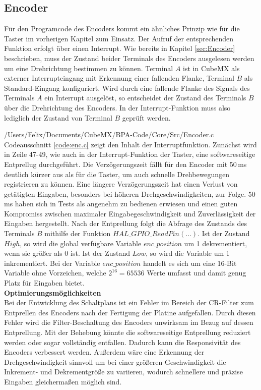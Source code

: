 
\subsection{Encoder}
Für den Programcode des Encoders kommt ein ähnliches Prinzip wie für die Taster im vorherigen Kapitel zum Einsatz. Der Aufruf der entsprechenden Funktion erfolgt über einen Interrupt.
Wie bereits in Kapitel \ref{sec:Encoder} beschrieben, muss der Zustand beider Terminals des Encoders ausgelesen werden um eine Drehrichtung bestimmen zu können. Terminal $A$ ist in CubeMX als externer Interrupteingang mit Erkennung einer fallenden Flanke, Terminal $B$ als Standard-Eingang konfiguriert. Wird durch eine fallende Flanke des Signals des Terminals $A$ ein Interrupt ausgelöst, so entscheidet der Zustand des Terminals $B$ über die Drehrichtung des Encoders. In der Interrupt-Funktion muss also lediglich der Zustand von Terminal $B$ geprüft werden. 

{/Users/Felix/Documents/CubeMX/BPA-Code/Core/Src/Encoder.c}
Codeausschnitt \ref{code:enc.c} zeigt den Inhalt der Interruptfunktion. Zunächst wird in Zeile 47-49, wie auch in der Interrupt-Funktion der Taster, eine softwareseitige Entprellug durchgeführt. Die Verzögerungszeit fällt für den Encoder mit 50\,ms deutlich kürzer aus als für die Taster, um auch schnelle Drehbewegungen registrieren zu können. Eine längere Verzögerungszeit hat einen Verlust von getätigten Eingaben, besonders bei höheren Drehgeschwindigkeiten, zur Folge. 50\,ms haben sich in Tests als angenehm zu bedienen erwiesen und einen guten Kompromiss zwischen maximaler Eingabegeschwindigkeit und Zuverlässigkeit der Eingaben hergestellt.
Nach der Entprellung folgt die Abfrage des Zustands des Terminals $B$ mithilfe der Funktion $HAL\_GPIO\_ReadPin(...)$. Ist der Zustand $High$, so wird die global verfügbare Variable $enc\_position$ um 1 dekrementiert, wenn sie größer als 0 ist. Ist der Zustand $Low$, so wird die Variable um 1 inkrementiert. Bei der Variable $enc\_position$ handelt es sich um eine 16-Bit Variable ohne Vorzeichen, welche $2^{16} = 65536$ Werte umfasst und damit genug Platz für Eingaben bietet.\\
\newline
\textbf{Optimierungsmöglichkeiten}\\
Bei der Entwicklung des Schaltplans ist ein Fehler im Bereich der CR-Filter zum Entprellen des Encoders nach der Fertigung der Platine aufgefallen. Durch diesen Fehler wird die Filter-Beschaltung des Encoders unwirksam im Bezug auf dessen Entprellung. Mit der Behebung könnte die softwareseitige Entprellung reduziert werden oder sogar vollständig entfallen. Dadurch kann die Responsivität des Encoders verbessert werden.
Außerdem wäre eine Erkennung der Drehgeschwindigkeit sinnvoll um bei einer größeren Geschwindigkeit die Inkrement- und Dekrementgröße zu variieren, wodurch schnellere und präzise Eingaben gleichermaßen möglich sind.
